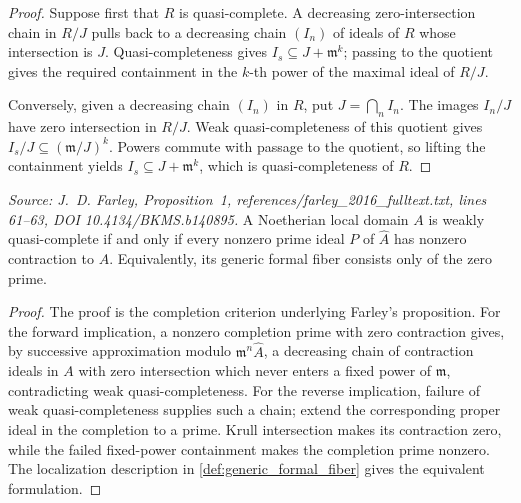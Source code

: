 \begin{proof}
  Suppose first that \(R\) is quasi-complete.  A decreasing zero-intersection
  chain in \(R/J\) pulls back to a decreasing chain \((I_n)\) of ideals of
  \(R\) whose intersection is \(J\).  Quasi-completeness gives
  \(I_s\subseteq J+\mathfrak m^k\); passing to the quotient gives the required
  containment in the \(k\)-th power of the maximal ideal of \(R/J\).

  Conversely, given a decreasing chain \((I_n)\) in \(R\), put
  \(J=\bigcap_n I_n\).  The images \(I_n/J\) have zero intersection in \(R/J\).
  Weak quasi-completeness of this quotient gives
  \(I_s/J\subseteq(\mathfrak m/J)^k\).  Powers commute with passage to the
  quotient, so lifting the containment yields
  \(I_s\subseteq J+\mathfrak m^k\), which is quasi-completeness of \(R\).
\end{proof}

\begin{lemma}
  \label{lem:farley_completion_criterion}
  \textit{Source: J.~D. Farley, Proposition~1,
  references/farley\_2016\_fulltext.txt, lines 61--63,
  DOI 10.4134/BKMS.b140895.}
  A Noetherian local domain \(A\) is weakly quasi-complete if and only if every
  nonzero prime ideal \(P\) of \(\widehat A\) has nonzero contraction to \(A\).
  Equivalently, its generic formal fiber consists only of the zero prime.
\end{lemma}

\begin{proof}
  The proof is the completion criterion underlying Farley's proposition.
  For the forward implication, a nonzero completion prime with zero
  contraction gives, by successive approximation modulo
  \(\mathfrak m^n\widehat A\), a decreasing chain of contraction ideals in
  \(A\) with zero intersection which never enters a fixed power of
  \(\mathfrak m\), contradicting weak quasi-completeness.  For the reverse
  implication, failure of weak quasi-completeness supplies such a chain;
  extend the corresponding proper ideal in the completion to a prime.
  Krull intersection makes its contraction zero, while the failed fixed-power
  containment makes the completion prime nonzero.  The localization
  description in \cref{def:generic_formal_fiber} gives the equivalent
  formulation.
\end{proof}

